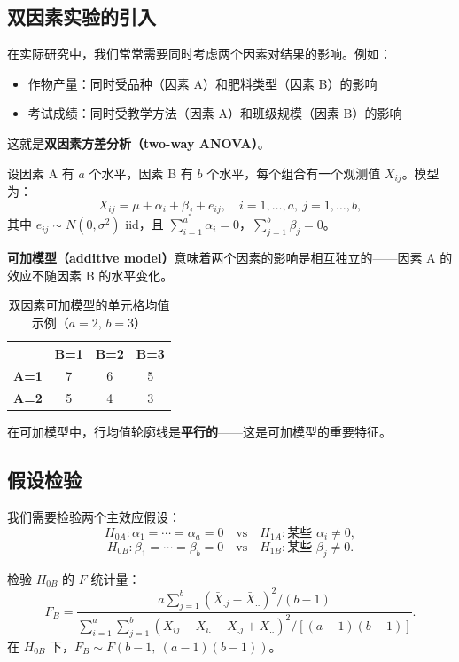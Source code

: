 \subsection{双因素实验的引入}

在实际研究中，我们常常需要同时考虑两个因素对结果的影响。例如：
\begin{itemize}
\item 作物产量：同时受品种（因素 A）和肥料类型（因素 B）的影响
\item 考试成绩：同时受教学方法（因素 A）和班级规模（因素 B）的影响
\end{itemize}

这就是\textbf{双因素方差分析（two-way ANOVA）}。

设因素 A 有 $a$ 个水平，因素 B 有 $b$ 个水平，每个组合有一个观测值 $X_{ij}$。模型为：
\[
X_{ij} = \mu + \alpha_i + \beta_j + e_{ij},\quad i = 1,\ldots,a,\ j = 1,\ldots,b,
\label{eq:two-way-additive-model}
\]
其中 $e_{ij} \sim N(0, \sigma^2)$ iid，且 $\sum_{i=1}^a \alpha_i = 0$，$\sum_{j=1}^b \beta_j = 0$。

\textbf{可加模型（additive model）}意味着两个因素的影响是相互独立的——因素 A 的效应不随因素 B 的水平变化。

\begin{table}[H]
\centering
\caption{双因素可加模型的单元格均值示例（$a=2$, $b=3$）}\label{tab:two-way-additive}
\begin{tabular}{c|ccc}
 & \textbf{B=1} & \textbf{B=2} & \textbf{B=3} \\
\hline
\textbf{A=1} & 7 & 6 & 5 \\
\textbf{A=2} & 5 & 4 & 3 \\
\hline
\end{tabular}
\end{table}

在可加模型中，行均值轮廓线是\textbf{平行的}——这是可加模型的重要特征。

\subsection{假设检验}

我们需要检验两个主效应假设：
\[
H_{0A}: \alpha_1 = \cdots = \alpha_a = 0 \quad \text{vs} \quad H_{1A}: \text{某些 } \alpha_i \neq 0,
\label{eq:two-way-H0A}
\]
\[
H_{0B}: \beta_1 = \cdots = \beta_b = 0 \quad \text{vs} \quad H_{1B}: \text{某些 } \beta_j \neq 0.
\label{eq:two-way-H0B}
\]

检验 $H_{0B}$ 的 $F$ 统计量：
\[
F_B = \frac{a\sum_{j=1}^b (\bar{X}_{.j} - \bar{X}_{..})^2 / (b-1)}
{\sum_{i=1}^a \sum_{j=1}^b (X_{ij} - \bar{X}_{i.} - \bar{X}_{.j} + \bar{X}_{..})^2 / [(a-1)(b-1)]}.
\label{eq:two-way-FB}
\]
在 $H_{0B}$ 下，$F_B \sim F(b-1,\ (a-1)(b-1))$。

